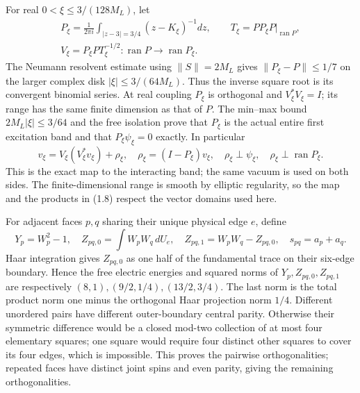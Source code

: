 \documentclass[
  11pt,
]{article}
\begin{document}
For real \(0<\xi\le3/(128M_L)\), let \[
\begin{gathered}
 P_\xi=\frac1{2\pi i}\int_{|z-3|=3/4}(z-K_\xi)^{-1}dz,
 \qquad T_\xi=PP_\xi P|_{\operatorname{ran}P},\\
 V_\xi=P_\xi P T_\xi^{-1/2}:
 \operatorname{ran}P\longrightarrow\operatorname{ran}P_\xi.
\end{gathered}
\tag{1.7}
\] The Neumann resolvent estimate using \(\|S\|=2M_L\) gives
\(\|P_\xi-P\|\le1/7\) on the larger complex disk \(|\xi|\le3/(64M_L)\).
Thus the inverse square root is its convergent binomial series. At real
coupling \(P_\xi\) is orthogonal and \(V_\xi^*V_\xi=I\); its range has
the same finite dimension as that of \(P\). The min--max bound
\(2M_L|\xi|\le3/64\) and the free isolation prove that \(P_\xi\) is the
actual entire first excitation band and that \(P_\xi\psi_\xi=0\)
exactly. In particular \[
 v_\xi=V_\xi(V_\xi^*v_\xi)+\rho_\xi,
 \quad \rho_\xi=(I-P_\xi)v_\xi,
 \quad \rho_\xi\perp\psi_\xi,
 \quad \rho_\xi\perp\operatorname{ran}P_\xi.
\tag{1.8}
\] This is the exact map to the interacting band; the same vacuum is
used on both sides. The finite-dimensional range is smooth by elliptic
regularity, so the map and the products in (1.8) respect the vector
domains used here.

For adjacent faces \(p,q\) sharing their unique physical edge \(e\),
define \[
 Y_p=W_p^2-1,\quad
 Z_{pq,0}=\int W_pW_q\,dU_e,\quad
 Z_{pq,1}=W_pW_q-Z_{pq,0},\quad s_{pq}=a_p+a_q.
\tag{1.9}
\] Haar integration gives \(Z_{pq,0}\) as one half of the fundamental
trace on their six-edge boundary. Hence the free electric energies and
squared norms of \(Y_p,Z_{pq,0},Z_{pq,1}\) are respectively
\((8,1),(9/2,1/4),(13/2,3/4)\). The last norm is the total product norm
one minus the orthogonal Haar projection norm \(1/4\). Different
unordered pairs have different outer-boundary central parity. Otherwise
their symmetric difference would be a closed mod-two collection of at
most four elementary squares; one square would require four distinct
other squares to cover its four edges, which is impossible. This proves
the pairwise orthogonalities; repeated faces have distinct joint spins
and even parity, giving the remaining orthogonalities.
\end{document}
